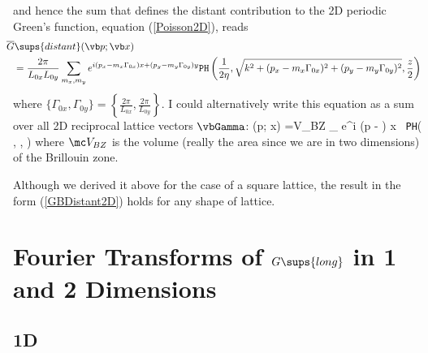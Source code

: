 \documentclass[letterpaper]{article}
\newcommand{\GB}{\overline{G}}
\begin{document}
and hence the sum that defines the distant contribution to the
2D periodic Green's function, equation (\ref{Poisson2D}), 
reads
\begin{align*}
&\hspace{-0.1in}\GB\sups{distant}(\vb p; \vb x) 
\\
&=\frac{2\pi}{L_{0x} L_{0y}} \sum_{m_x, m_y}
    e^{i (p_x - m_x\Gamma_{0x}) x + (p_y-m_y \Gamma_{0y}) y}
    \texttt{PH}\left( \frac{1}{2\eta}, 
                      \sqrt{k^2 + (p_x-m_x \Gamma_{0x})^2 + (p_y-m_y\Gamma_{0y})^2},
                      \frac{z}{2}
               \right)
\end{align*}
where $\{\Gamma_{0x}, \Gamma_{0y}\}=\left\{\frac{2\pi}{L_{0x}}, \frac{2\pi}{L_{0y}}\right\}$.
I could alternatively write this equation as a sum over all 
2D reciprocal lattice vectors $\vbGamma$:
{
   \GB{}(\vb p; \vb x) 
   =\mc V_{BZ} \sum_{\vbGamma} 
    e^{i (\vb p - \vbGamma) \cdot \vb x} \,
    \texttt{PH}\left( , 
                      ,
               \right)
}
where $\mc V_{BZ}$ is the volume (really the area since we 
are in two dimensions) of the Brillouin zone.

Although we derived it above for the case of a square lattice,
the result in the form (\ref{GBDistant2D}) holds for any 
shape of lattice.

\appendix 

\newpage
\section{Fourier Transforms of $G\sups{long}$ in 1 and 2 Dimensions}

\subsection{1D}
\end{document}
